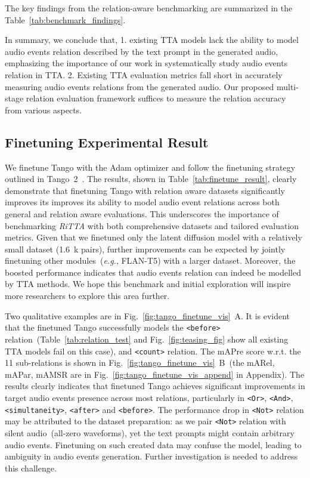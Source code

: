 The key findings from the relation-aware benchmarking are summarized in the Table~\ref{tab:benchmark_findings}.

In summary, we conclude that, 1. existing TTA models lack the ability to model audio events relation described by the text prompt in the generated audio, emphasizing the importance of our work in systematically study audio events relation in TTA. 2. Existing TTA evaluation metrics fall short in accurately measuring audio events relations from the generated audio. Our proposed multi-stage relation evaluation framework suffices to measure the relation accuracy from various aspects.

\subsection{Finetuning Experimental Result}

We finetune Tango with the Adam optimizer and follow the finetuning strategy outlined in Tango~2~\citep{ghosal2023tango2}. The results, shown in Table~\ref{tab:finetune_result}, clearly demonstrate that finetuning Tango with relation aware datasets significantly improves its improves its ability to model audio event relations across both general and relation aware evaluations. This underscores the importance of benchmarking \emph{RiTTA} with both comprehensive datasets and tailored evaluation metrics. Given that we finetuned only the latent diffusion model with a relatively small dataset (1.6~k pairs), further improvements can be expected by jointly finetuning other modules~(\textit{e.g.}, FLAN-T5) with a larger dataset. Moreover, the boosted performance indicates that audio events relation can indeed be modelled by TTA methods. We hope this benchmark and initial exploration will inspire more researchers to explore this area further.

Two qualitative examples are in Fig.~\ref{fig:tango_finetune_vis}~A. It is evident that the finetuned Tango successfully models the \texttt{<before>} relation~(Table~\ref{tab:relation_test} and Fig.~\ref{fig:teasing_fig} show all existing TTA models fail on this case), and \texttt{<count>} relation. The mAPre score w.r.t. the 11 sub-relations is shown in Fig.~\ref{fig:tango_finetune_vis}~B~(the mARel, mAPar, mAMSR are in Fig.~\ref{fig:tango_finetune_vis_append} in Appendix). The results clearly indicates that finetuned Tango achieves significant improvements in target audio events presence across most relations, particularly in \texttt{<Or>}, \texttt{<And>}, \texttt{<simultaneity>}, \texttt{<after>} and \texttt{<before>}. The performance drop in \texttt{<Not>} relation may be attributed to the dataset preparation: as we pair \texttt{<Not>} relation with silent audio~(all-zero waveforms), yet the text prompts might contain arbitrary audio events. Finetuning on such created data may confuse the model, leading to ambiguity in audio events generation. Further investigation is needed to address this challenge. 

